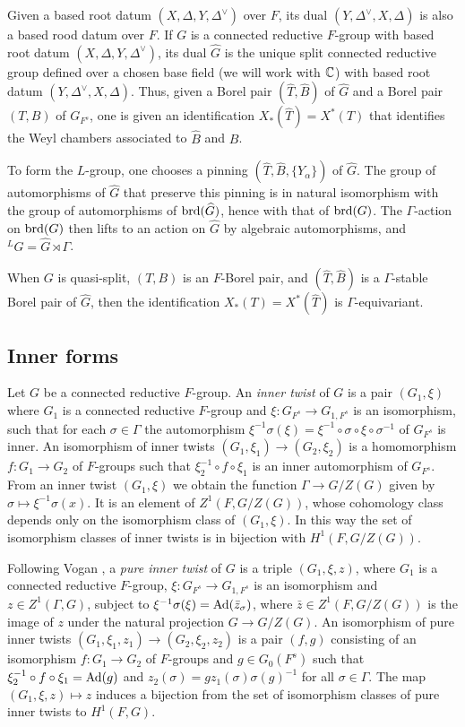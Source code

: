 \documentclass{article}
\theoremstyle{definition}
\numberwithin{equation}{section}
\renewcommand{\-}{\hyp{}}
\begin{document}
Given a based root datum $(X,\Delta,Y,\Delta^\vee)$ over $F$, its dual $(Y,\Delta^\vee,X,\Delta)$ is also a based rood datum over $F$. If $G$ is a connected reductive $F$-group with based root datum $(X,\Delta,Y,\Delta^\vee)$, its dual $\hat G$ is the unique split connected reductive group defined over a chosen base field (we will work with $\mathbb{C}$) with based root datum $(Y,\Delta^\vee,X,\Delta)$. Thus, given a Borel pair $(\hat T,\hat B)$ of $\hat G$ and a Borel pair $(T,B)$ of $G_{F^s}$, one is given an identification $X_*(\hat T)=X^*(T)$ that identifies the Weyl chambers associated to $\hat B$ and $B$.

To form the $L$\-group, one chooses a pinning $(\hat T,\hat B,\{Y_\alpha\})$ of $\hat G$. The group of automorphisms of $\hat G$ that preserve this pinning is in natural isomorphism with the group of automorphisms of $\textrm{brd}(\widehat G)$, hence with that of $\textrm{brd}(G)$. The $\Gamma$-action on $\textrm{brd}(G)$ then lifts to an action on $\hat G$ by algebraic automorphisms, and $^LG=\hat G \rtimes \Gamma$.

When $G$ is quasi-split, $(T,B)$ is an $F$-Borel pair, and $(\hat T,\hat B)$ is a $\Gamma$-stable Borel pair of $\hat G$, then the identification $X_*(T)=X^*(\hat T)$ is $\Gamma$-equivariant.

\subsection{Inner forms}

Let $G$ be a connected reductive $F$-group. An \emph{inner twist} of $G$ is a pair $(G_1,\xi)$ where $G_1$ is a connected reductive $F$-group and $\xi : G_{F^s} \to G_{1,F^s}$ is an isomorphism, such that for each $\sigma \in \Gamma$ the automorphism $\xi^{-1}\sigma(\xi) = \xi^{-1}\circ\sigma\circ\xi\circ\sigma^{-1}$ of $G_{F^s}$ is inner. An isomorphism of inner twists $(G_1,\xi_1) \to (G_2,\xi_2)$ is a homomorphism $f : G_1 \to G_2$ of $F$-groups such that $\xi_2^{-1}\circ f \circ \xi_1$ is an inner automorphism of $G_{F^s}$. From an inner twist $(G_1,\xi)$ we obtain the function $\Gamma \to G/Z(G)$ given by $\sigma \mapsto \xi^{-1}\sigma(x)$. It is an element of $Z^1(F,G/Z(G))$, whose cohomology class depends only on the isomorphism class of $(G_1,\xi)$. In this way the set of isomorphism classes of inner twists is in bijection with $H^1(F,G/Z(G))$.



Following Vogan \cite{Vog93}, a \emph{pure inner twist} of $G$ is a triple $(G_1,\xi,z)$, where $G_1$ is a connected reductive $F$-group, $\xi : G_{F^s} \to G_{1,F^s}$ is an isomorphism and $z \in Z^1(\Gamma,G)$, subject to $\xi^{-1}\sigma(\xi)=\textrm{Ad}(\bar z_\sigma)$, where $\bar z \in Z^1(F,G/Z(G))$ is the image of $z$ under the natural projection $G \to G/Z(G)$. An isomorphism of pure inner twists $(G_1,\xi_1,z_1) \to (G_2,\xi_2,z_2)$ is a pair $(f,g)$ consisting of an isomorphism $f : G_1 \to G_2$ of $F$-groups and $g \in G_0(F^s)$ such that $\xi_2^{-1}\circ f \circ \xi_1=\textrm{Ad}(g)$ and $z_2(\sigma)=gz_1(\sigma)\sigma(g)^{-1}$ for all $\sigma \in \Gamma$. The map $(G_1,\xi,z) \mapsto z$ induces a bijection from the set of isomorphism classes of pure inner twists to $H^1(F,G)$.
\end{document}
